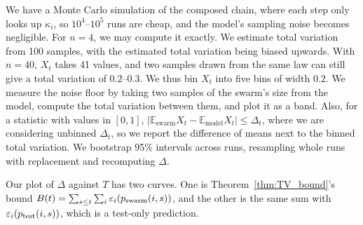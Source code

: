 We have a Monte Carlo simulation of the composed chain, where each step only looks up $\kappa_i$, so $10^4$--$10^5$ runs are cheap, and the model's sampling noise becomes negligible.
For $n=4$, we may compute it exactly.
We estimate total variation from 100 samples, with the estimated total variation being biased upwards.
With $n=40$, $X_t$ takes 41 values, and two samples drawn from the same law can still give a total variation of $0.2$--$0.3$.
We thus bin $X_t$ into five bins of width $0.2$.
We measure the noise floor by taking two samples of the swarm's size from the model, compute the total variation between them, and plot it as a band.
Also, for a statistic with values in $[0, 1]$, $\lvert \mathbb{E}_{\text{swarm}} X_t - \mathbb{E}_{\text{model}} X_t \rvert \leq \Delta_t$, where we are considering unbinned $\Delta_t$, so we report the difference of means next to the binned total variation.
We bootstrap 95\% intervals across runs, resampling whole runs with replacement and recomputing $\Delta$.

Our plot of $\Delta$ against $T$ has two curves.
One is Theorem~\ref{thm:TV_bound}'s bound $B(t) = \sum_{s \leq t} \sum_i \varepsilon_i(p_{\mathrm{swarm}}(i, s))$, and the other is the same sum with $\varepsilon_i(p_{\mathrm{test}}(i, s))$, which is a test-only prediction.


